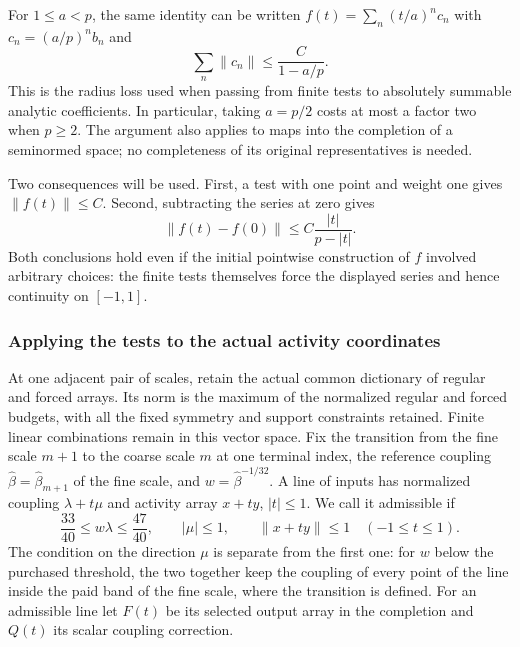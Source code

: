 For $1\le a<p$, the same identity can be written
$f(t)=\sum_n(t/a)^nc_n$ with $c_n=(a/p)^nb_n$ and
\begin{equation}\label{eq:ray-radius-loss}
                        \sum_n\|c_n\|\le\frac{C}{1-a/p}.
\end{equation}
This is the radius loss used when passing from finite tests to
absolutely summable analytic coefficients. In particular, taking
$a=p/2$ costs at most a factor two when $p\ge2$. The argument
also applies to maps into the completion of a seminormed space;
no completeness of its original representatives is needed.

Two consequences will be used. First, a test with one point and
weight one gives $\|f(t)\|\le C$. Second, subtracting the series
at zero gives
\begin{equation}\label{eq:ray-increment}
                 \|f(t)-f(0)\|\le C\frac{|t|}{p-|t|}.
\end{equation}
Both conclusions hold even if the initial pointwise construction
of $f$ involved arbitrary choices: the finite tests themselves
force the displayed series and hence continuity on $[-1,1]$.

\subsubsection{Applying the tests to the actual activity coordinates}
At one adjacent pair of scales, retain the actual common dictionary
of regular and forced arrays. Its norm is the maximum of the
normalized regular and forced budgets, with all the fixed symmetry
and support constraints retained. Finite linear combinations remain
in this vector space. Fix the transition from the fine scale $m+1$
to the coarse scale $m$ at one terminal index, the reference coupling
$\widehat\beta=\widehat\beta_{m+1}$ of the fine scale, and
$w=\widehat\beta^{-1/32}$. A line of inputs has normalized coupling
$\lambda+t\mu$ and activity array $x+ty$, $|t|\le1$. We call it
admissible if
\begin{equation}\label{eq:background-ray-admissible}
 \frac{33}{40}\le w\lambda\le\frac{47}{40},\qquad |\mu|\le1,\qquad
 \|x+ty\|\le1\quad(-1\le t\le1).
\end{equation}
The condition on the direction $\mu$ is separate from the first
one: for $w$ below the purchased threshold, the two together keep the
coupling of every point of the line inside the paid band of the fine
scale, where the transition is defined. For an admissible line let
$F(t)$ be its selected output array in the completion and $Q(t)$ its
scalar coupling correction.

